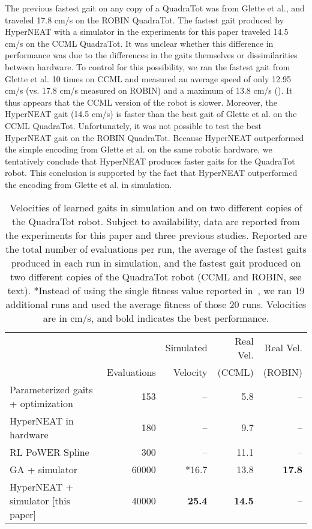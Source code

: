 The previous fastest gait on any copy of a QuadraTot was from Glette
et al., and traveled 17.8 cm/s on the ROBIN QuadraTot. The
fastest gait produced by HyperNEAT with a simulator in the experiments for this paper traveled 14.5
cm/s on the CCML QuadraTot. It was unclear whether this difference in performance was due to
the differences in the gaits themselves or dissimilarities between
hardware. To control for this possibility, we ran the fastest gait
from Glette et al. 10 times on CCML and measured an average speed of
only 12.95 cm/s (vs. 17.8 cm/s measured on ROBIN) and a maximum of
13.8 cm/s (). It thus appears that the CCML version of the robot is slower. Moreover, the HyperNEAT gait (14.5 cm/s) is faster than the best gait of Glette et al. on the CCML QuadraTot. Unfortunately, it was not possible to test the best HyperNEAT gait on the ROBIN QuadraTot. Because HyperNEAT outperformed the simple encoding from Glette et al. on the same robotic hardware, we tentatively
conclude that HyperNEAT produces faster gaits for the QuadraTot robot. This conclusion is supported by the fact that HyperNEAT outperformed the encoding from Glette et al. in simulation. 

\begin{table}
\begin{center}
\begin{tabular}{|l|r|r|r|r|}
\hline
                                         &              & Simulated  & Real Vel. & Real Vel.  \\
                                         & Evaluations  & Velocity &    (CCML)     & (ROBIN) \\
\hline
Parameterized gaits + optimization \cite{yos:clune}   &153    & --    & 5.8 & --\\
\hline
HyperNEAT in hardware \cite{yos:clune}                 & 180         & --         &   9.7  & --   \\
\hline
RL PoWER Spline \cite{haocheng}                         & 300         & --         &   11.1 & --\\
\hline
GA + simulator \cite{glette}             & 60000       & *16.7       &   13.8   & \textbf{17.8}  \\
\hline
HyperNEAT + simulator [this paper]                     & 40000       & \textbf{25.4}       &   \textbf{14.5} & --\\
\hline
\end{tabular}
\vspace{.35cm}
\caption{Velocities of learned gaits in simulation and on two different copies of the QuadraTot robot. Subject to availability, data are reported from the experiments for this paper and three previous studies. Reported are the total number of evaluations per run, the average of the fastest gaits produced in each run in simulation, and the fastest gait produced on two different copies of the QuadraTot robot (CCML and ROBIN, see text). *Instead of using the single fitness value reported in~\cite{glette}, we ran 19 additional runs and used the average fitness of those 20 runs. Velocities are in cm/s, and bold indicates the best performance.}  
\end{center}
\end{table}

